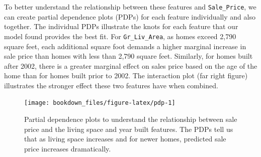 \documentclass[]{krantz}
\makeatletter
\newenvironment{Shaded}{\begin{snugshade}}{\end{snugshade}}
\newcommand{\CommentTok}[1]{\textcolor[rgb]{0.37,0.37,0.37}{\textit{#1}}}
\newcommand{\DataTypeTok}[1]{\textcolor[rgb]{0.27,0.27,0.27}{#1}}
\newcommand{\DecValTok}[1]{\textcolor[rgb]{0.06,0.06,0.06}{#1}}
\newcommand{\KeywordTok}[1]{\textcolor[rgb]{0.27,0.27,0.27}{\textbf{#1}}}
\newcommand{\NormalTok}[1]{#1}
\newcommand{\OperatorTok}[1]{\textcolor[rgb]{0.43,0.43,0.43}{\textbf{#1}}}
\newcommand{\OtherTok}[1]{\textcolor[rgb]{0.37,0.37,0.37}{#1}}
\newcommand{\StringTok}[1]{\textcolor[rgb]{0.5,0.5,0.5}{#1}}
\newenvironment{kframe}{%
\medskip{}
\setlength{\fboxsep}{.8em}
 \def\at@end@of@kframe{}%
 \ifinner\ifhmode%
  \def\at@end@of@kframe{\end{minipage}}%
  \begin{minipage}{\columnwidth}%
 \fi\fi%
 \def\FrameCommand##1{\hskip\@totalleftmargin \hskip-\fboxsep
 \colorbox{shadecolor}{##1}\hskip-\fboxsep
     \hskip-\linewidth \hskip-\@totalleftmargin \hskip\columnwidth}%
 \MakeFramed {\advance\hsize-\width
   \@totalleftmargin\z@ \linewidth\hsize
   \@setminipage}}%
 {\par\unskip\endMakeFramed%
 \at@end@of@kframe}
\renewenvironment{Shaded}{\begin{kframe}}{\end{kframe}}
\makeatother
\begin{document}
To better understand the relationship between these features and \texttt{Sale\_Price}, we can create partial dependence plots (PDPs) for each feature individually and also together. The individual PDPs illustrate the knots for each feature that our model found provides the best fit. For \texttt{Gr\_Liv\_Area}, as homes exceed 2,790 square feet, each additional square foot demands a higher marginal increase in sale price than homes with less than 2,790 square feet. Similarly, for homes built after 2002, there is a greater marginal effect on sales price based on the age of the home than for homes built prior to 2002. The interaction plot (far right figure) illustrates the stronger effect these two features have when combined.

\begin{Shaded}
\end{Shaded}

\begin{figure}

{\centering \texttt{[image: bookdown\_files/figure-latex/pdp-1]} 

}

\caption{Partial dependence plots to understand the relationship between sale price and the living space and year built features.  The PDPs tell us that as living space increases and for newer homes, predicted sale price increases dramatically.}\label{fig:pdp}
\end{figure}
\end{document}
